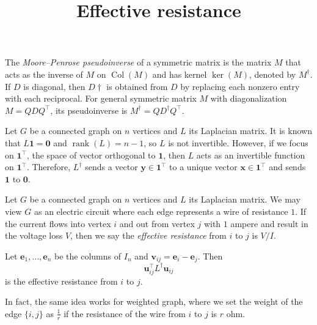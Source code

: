 \documentclass{article}
\title{Effective resistance}
\date{\vspace{-1cm}}
\newcommand{\trans}{^\top}
\newcommand{\bzero}{\mathbf{0}}
\newcommand{\bone}{\mathbf{1}}
\newcommand{\be}{\mathbf{e}}
\newcommand{\bx}{\mathbf{x}}
\newcommand{\by}{\mathbf{y}}
\newcommand{\bu}{\mathbf{u}}
\newcommand{\bv}{\mathbf{v}}
\newcommand{\rank}{\operatorname{rank}}
\newcommand{\Col}{\operatorname{Col}}
\theoremstyle{definition}
\begin{document}
\maketitle
\large

The \emph{Moore--Penrose pseudoinverse} of a symmetric matrix is the matrix $M$ that acts as the inverse of $M$ on $\Col(M)$ and has kernel $\ker(M)$, denoted by $M^\dagger$.  If $D$ is diagonal, then $D\dagger$ is obtained from $D$ by replacing each nonzero entry with each reciprocal.  For general symmetric matrix $M$ with diagonalization $M = QDQ\trans$, its pseudoinverse is $M^\dagger = QD^\dagger Q\trans$.

Let $G$ be a connected graph on $n$ vertices and $L$ its Laplacian matrix.  It is known that $L\bone = \bzero$ and $\rank(L) = n-1$, so $L$ is not invertible.  However, if we focus on $\bone\trans$, the space of vector orthogonal to $\bone$, then $L$ acts as an invertible function on $\bone\trans$.  Therefore, $L^\dagger$ sends a vector $\by\in\bone\trans$ to a unique vector $\bx\in\bone\trans$ and sends $\bone$ to $\bzero$.  

Let $G$ be a connected graph on $n$ vertices and $L$ its Laplacian matrix.  We may view $G$ as an electric circuit where each edge represents a wire of resistance $1$.  If the current flows into vertex $i$ and out from vertex $j$ with $1$ ampere and result in the voltage loss $V$, then we say the \emph{effective resistance} from $i$ to $j$ is $V/I$.  

Let $\be_1,\ldots,\be_n$ be the columns of $I_n$ and $\bv_{ij} = \be_i - \be_j$.  Then 
\[\bu_{ij}\trans L^\dagger\bu_{ij}\]
is the effective resistance from $i$ to $j$.  

In fact, the same idea works for weighted graph, where we set the weight of the edge $\{i,j\}$ as $\frac{1}{r}$ if the resistance of the wire from $i$ to $j$ is $r$ ohm.
\end{document}
